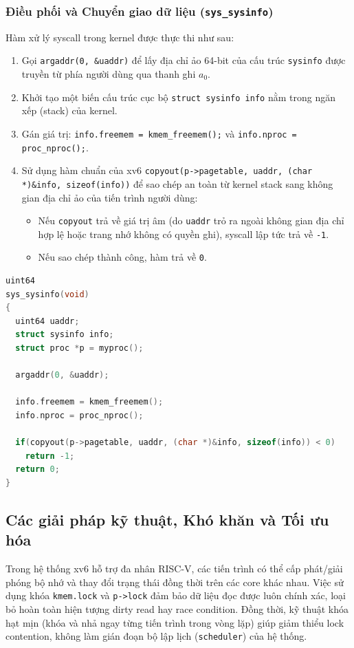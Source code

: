 \subsubsection{Điều phối và Chuyển giao dữ liệu (\texttt{sys\_sysinfo})}
Hàm xử lý syscall trong kernel được thực thi như sau:
\begin{enumerate}
    \item Gọi \texttt{argaddr(0, \&uaddr)} để lấy địa chỉ ảo 64-bit của cấu trúc \texttt{sysinfo} được truyền từ phía người dùng qua thanh ghi $a_0$.
    \item Khởi tạo một biến cấu trúc cục bộ \texttt{struct sysinfo info} nằm trong ngăn xếp (stack) của kernel.
    \item Gán giá trị: \texttt{info.freemem = kmem\_freemem();} và \texttt{info.nproc = proc\_nproc();}.
    \item Sử dụng hàm chuẩn của xv6 \texttt{copyout(p->pagetable, uaddr, (char *)\&info, sizeof(info))} để sao chép an toàn từ kernel stack sang không gian địa chỉ ảo của tiến trình người dùng:
    \begin{itemize}
        \item Nếu \texttt{copyout} trả về giá trị âm (do \texttt{uaddr} trỏ ra ngoài không gian địa chỉ hợp lệ hoặc trang nhớ không có quyền ghi), syscall lập tức trả về \texttt{-1}.
        \item Nếu sao chép thành công, hàm trả về \texttt{0}.
    \end{itemize}
\end{enumerate}

\begin{lstlisting}[language=C, caption={Cài đặt hàm xử lý syscall trong kernel/sysproc.c}]
uint64
sys_sysinfo(void)
{
  uint64 uaddr;
  struct sysinfo info;
  struct proc *p = myproc();

  argaddr(0, &uaddr);

  info.freemem = kmem_freemem();
  info.nproc = proc_nproc();

  if(copyout(p->pagetable, uaddr, (char *)&info, sizeof(info)) < 0)
    return -1;
  return 0;
}
\end{lstlisting}

\subsection{Các giải pháp kỹ thuật, Khó khăn và Tối ưu hóa}

\begin{callouttip}
    Trong hệ thống xv6 hỗ trợ đa nhân RISC-V, các tiến trình có thể cấp phát/giải phóng bộ nhớ và thay đổi trạng thái đồng thời trên các core khác nhau. Việc sử dụng khóa \texttt{kmem.lock} và \texttt{p->lock} đảm bảo dữ liệu đọc được luôn chính xác, loại bỏ hoàn toàn hiện tượng dirty read hay race condition. Đồng thời, kỹ thuật khóa hạt mịn (khóa và nhả ngay từng tiến trình trong vòng lặp) giúp giảm thiểu lock contention, không làm gián đoạn bộ lập lịch (\texttt{scheduler}) của hệ thống.
\end{callouttip}

